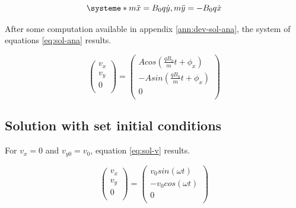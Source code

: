 \documentclass[a4paper,12pt,twoside]{article}
\begin{document}
\begin{equation}
\systeme*{m\ddot{x} = B_0q\dot{y}, m\ddot{y} = - B_0q\dot{x}}
\label{eq:equa-diff-simple}
\end{equation}

After some computation available in appendix \ref{ann:dev-sol-ana}, the system of equations \ref{eq:sol-ana} results.

\begin{equation}
	\begin{pmatrix} v_x\\ v_y\\ 0\\ \end{pmatrix} = \begin{pmatrix} Acos(\frac{qB_0}{m} t + \phi_x)\\ -Asin(\frac{qB_0}{m} t + \phi_x)\\ 0\\ \end{pmatrix}
\label{eq:sol-ana}
\end{equation}

\subsection{Solution with set initial conditions}

For $v_x=0$ and $v_{y0} = v_0$, equation \ref{eq:sol-v} results.

\begin{equation}
	\begin{pmatrix} v_x\\ v_y\\ 0\\ \end{pmatrix} = \begin{pmatrix} v_0 sin(\omega t)\\ -v_0 cos(\omega t)\\ 0\\ \end{pmatrix}
\label{eq:sol-v}
\end{equation}
\end{document}
